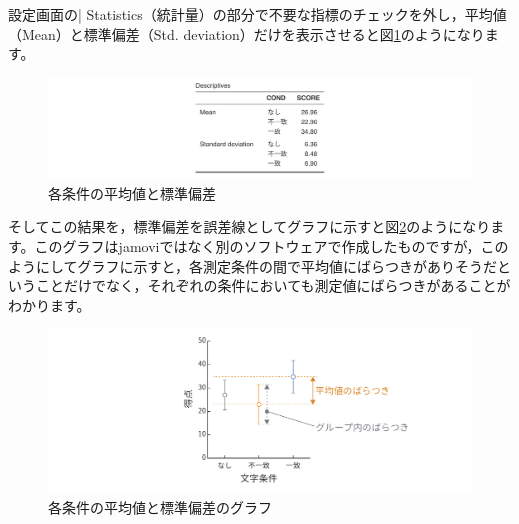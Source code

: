 \documentclass[
  12pt,
  a5jpaper,
  lualatex, ja=standard]{bxjsbook}
\begin{document}
設定画面の\colorbox{bar}{\textcolor{gmoji2}{| Statistics}}（統計量）の部分で不要な指標のチェックを外し，平均値（Mean）と標準偏差（Std. deviation）だけを表示させると図\ref{fig:ANOVA-oneway-means}のようになります。

\begin{figure}[!ht]

{\centering \includegraphics[width=1\linewidth]{images/ANOVA/oneway-means} 

}

\caption{各条件の平均値と標準偏差}\label{fig:ANOVA-oneway-means}
\end{figure}

そしてこの結果を，標準偏差を誤差線としてグラフに示すと図\ref{fig:ANOVA-oneway-means-plot}のようになります。このグラフはjamoviではなく別のソフトウェアで作成したものですが，このようにしてグラフに示すと，各測定条件の間で平均値にばらつきがありそうだということだけでなく，それぞれの条件においても測定値にばらつきがあることがわかります。

\begin{figure}[!ht]

{\centering \includegraphics[width=1\linewidth]{images/ANOVA/oneway-means-plot} 

}

\caption{各条件の平均値と標準偏差のグラフ}\label{fig:ANOVA-oneway-means-plot}
\end{figure}
\end{document}
